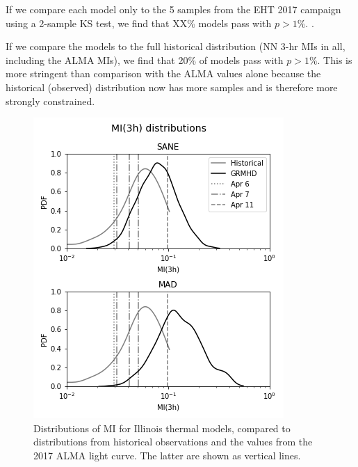If we compare each model only to the 5 samples from the EHT 2017 campaign using a 2-sample KS test, we find that XX\% models pass with $p > 1\%$.  .

If we compare the models to the full historical distribution (NN 3-hr MIs in all, including the ALMA MIs), we find that 20\% of models pass with $p > 1\%$.  This is more stringent than comparison with the ALMA values alone because the historical (observed)  distribution now has more samples and is therefore more strongly constrained.  

\begin{figure}
  \centering
  \includegraphics[width=\columnwidth]{./figures/mi_dist.png}
  \caption{Distributions of MI for Illinois thermal models, compared to distributions from historical observations and the values from the 2017 ALMA light curve. The latter are shown as vertical lines.
  }
  \label{fig:cmp_ALMA_var}
\end{figure}

